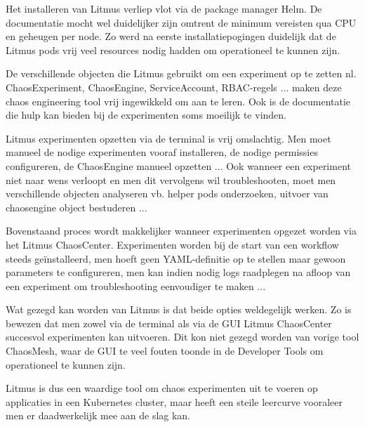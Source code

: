 Het installeren van Litmus verliep vlot via de package manager Helm. De documentatie mocht wel duidelijker zijn omtrent de minimum vereisten qua CPU en geheugen per node. Zo werd na eerste installatiepogingen duidelijk dat de Litmus pods vrij veel resources nodig hadden om operationeel te kunnen zijn.   

De verschillende objecten die Litmus gebruikt om een experiment op te zetten nl. ChaosExperiment, ChaosEngine, ServiceAccount, RBAC-regels ... maken deze chaos engineering tool vrij ingewikkeld om aan te leren. Ook is de documentatie die hulp kan bieden bij de experimenten soms moeilijk te vinden. 

Litmus experimenten opzetten via de terminal is vrij omslachtig. Men moet manueel de nodige experimenten vooraf installeren, de nodige permissies configureren, de ChaosEngine manueel opzetten ...
Ook wanneer een experiment niet naar wens verloopt en men dit vervolgens wil troubleshooten, moet men verschillende objecten analyseren vb. helper pods onderzoeken, uitvoer van chaosengine object bestuderen ... 

Bovenstaand proces wordt makkelijker wanneer experimenten opgezet worden via het Litmus ChaosCenter. Experimenten worden bij de start van een workflow steeds geïnstalleerd, men hoeft geen YAML-definitie op te stellen maar gewoon parameters te configureren, men kan indien nodig logs raadplegen na afloop van een experiment om troubleshooting eenvoudiger te maken ...

Wat gezegd kan worden van Litmus is dat beide opties weldegelijk werken. Zo is bewezen dat men zowel via de terminal als via de GUI Litmus ChaosCenter succesvol experimenten kan uitvoeren. Dit kon niet gezegd worden van vorige tool ChaosMesh, waar de GUI te veel fouten toonde in de Developer Tools om operationeel te kunnen zijn.

Litmus is dus een waardige tool om chaos experimenten uit te voeren op applicaties in een Kubernetes cluster, maar heeft een steile leercurve vooraleer men er daadwerkelijk mee aan de slag kan. 